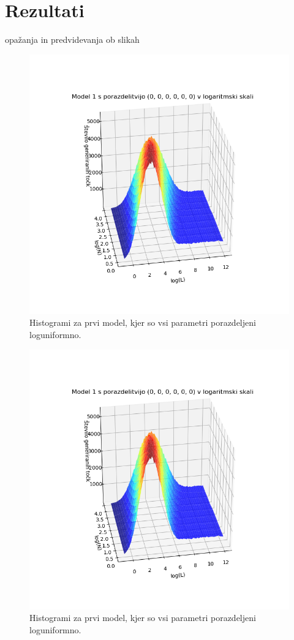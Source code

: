 \documentclass[a4paper]{IEEEtran}
\begin{document}
\section{Rezultati}

opažanja in predvidevanja ob slikah
\begin{figure}[h]
	\centering
	\includegraphics[width=0.9\linewidth]{Figures/porazdelitev3D}
	\caption{Histogrami za prvi model, kjer so vsi parametri porazdeljeni loguniformno.}
	\label{fig:porazdelitev3d}
\end{figure}

\begin{figure}
	\centering
	\includegraphics[width=0.7\linewidth]{Figures/porazdelitev3D}
	\caption{Histogrami za prvi model, kjer so vsi parametri porazdeljeni loguniformno.}
	\label{fig:porazdelitev3d}
\end{figure}
\end{document}
